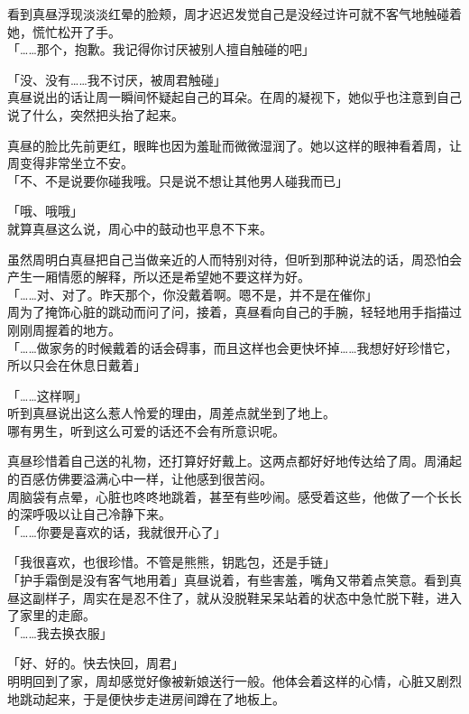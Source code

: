 看到真昼浮现淡淡红晕的脸颊，周才迟迟发觉自己是没经过许可就不客气地触碰着她，慌忙松开了手。\\

「……那个，抱歉。我记得你讨厌被别人擅自触碰的吧」

「没、没有……我不讨厌，被周君触碰」\\

真昼说出的话让周一瞬间怀疑起自己的耳朵。在周的凝视下，她似乎也注意到自己说了什么，突然把头抬了起来。

真昼的脸比先前更红，眼眸也因为羞耻而微微湿润了。她以这样的眼神看着周，让周变得非常坐立不安。\\

「不、不是说要你碰我哦。只是说不想让其他男人碰我而已」

「哦、哦哦」\\

就算真昼这么说，周心中的鼓动也平息不下来。

虽然周明白真昼把自己当做亲近的人而特别对待，但听到那种说法的话，周恐怕会产生一厢情愿的解释，所以还是希望她不要这样为好。\\

「……对、对了。昨天那个，你没戴着啊。嗯不是，并不是在催你」\\

周为了掩饰心脏的跳动而问了问，接着，真昼看向自己的手腕，轻轻地用手指描过刚刚周握着的地方。\\

「……做家务的时候戴着的话会碍事，而且这样也会更快坏掉……我想好好珍惜它，所以只会在休息日戴着」

「……这样啊」\\

听到真昼说出这么惹人怜爱的理由，周差点就坐到了地上。\\

哪有男生，听到这么可爱的话还不会有所意识呢。

真昼珍惜着自己送的礼物，还打算好好戴上。这两点都好好地传达给了周。周涌起的百感仿佛要溢满心中一样，让他感到很苦闷。\\

周脑袋有点晕，心脏也咚咚地跳着，甚至有些吵闹。感受着这些，他做了一个长长的深呼吸以让自己冷静下来。\\

「……你要是喜欢的话，我就很开心了」

「我很喜欢，也很珍惜。不管是熊熊，钥匙包，还是手链」\\

「护手霜倒是没有客气地用着」真昼说着，有些害羞，嘴角又带着点笑意。看到真昼这副样子，周实在是忍不住了，就从没脱鞋呆呆站着的状态中急忙脱下鞋，进入了家里的走廊。\\

「……我去换衣服」

「好、好的。快去快回，周君」\\

明明回到了家，周却感觉好像被新娘送行一般。他体会着这样的心情，心脏又剧烈地跳动起来，于是便快步走进房间蹲在了地板上。

